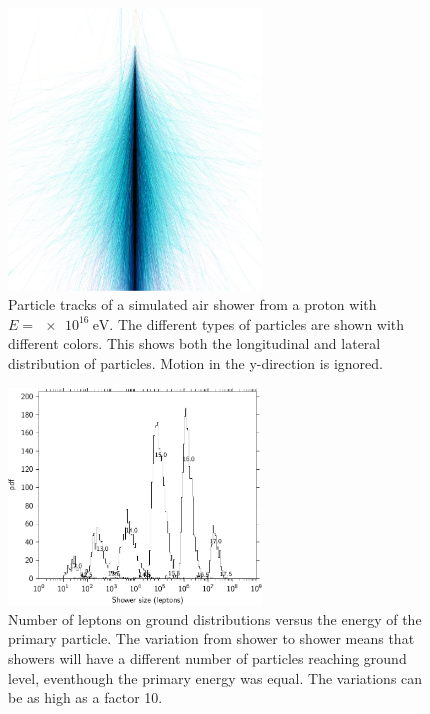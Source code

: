 \begin{figure}
    \centering
    \includegraphics[width=0.6\textwidth]
                    {plots/cosmic-rays/shower.jpg}
    \caption{Particle tracks of a simulated air shower from a proton with $E = \SI{e16}{\eV}$. The different types of particles are shown with different colors. This shows both the longitudinal and lateral distribution of particles. Motion in the y-direction is ignored. \cite{heck2013corsika}}
    \label{fig:shower}
\end{figure}

\begin{figure}
    \centering
    \includegraphics[width=0.6\textwidth]
                    {plots/cosmic-rays/shower_size_distribution}
    \caption{Number of leptons on ground distributions versus the energy of the primary particle. The variation from shower to shower means that showers will have a different number of particles reaching ground level, eventhough the primary energy was equal. The variations can be as high as a factor 10.  \cite{heck2013corsika}}
    \label{fig:shower_size_distribution}
\end{figure}


